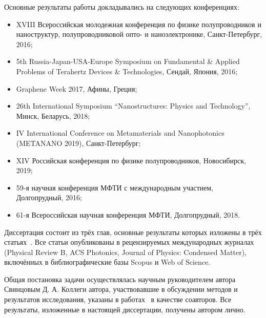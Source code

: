 Основные результаты работы докладывались на следующих конференциях:
\begin{itemize}
\item XVIII Всероссийская молодежная конференция по физике полупроводников и наноструктур, полупроводниковой опто- и наноэлектронике, Санкт-Петербург, 2016;
\item 5th Russia-Japan-USA-Europe Symposium on Fundamental \& Applied Problems of Terahertz Devices \& Technologies, Сендай, Япония, 2016;
\item Graphene Week 2017, Афины, Греция;
\item 26th International Symposium ``Nanostructures: Physics and Technology'', Минск, Беларусь, 2018;
\item IV International Conference on Metamaterials and Nanophotonics (METANANO 2019), Санкт-Петербург;
\item XIV Российская конференция по физике полупроводников, Новосибирск, 2019;
\item 59-я научная конференция МФТИ с международным участием, Долгопрудный, 2016;
\item 61-я Всероссийская научная конференция МФТИ, Долгопрудный, 2018.
\end{itemize}

Диссертация состоит из трёх глав, основные результаты которых изложены в трёх статьях~\cite{my_graphene,my_HgCdTe,my_plasmon}. Все статьи опубликованы в рецензируемых международных журналах (Physical Review B, ACS Photonics, Journal of Physics: Condensed Matter), включённых в библиографические базы Scopus и Web of Science.
    
\contribution Общая постановка задачи осуществлялась научным руководителем
автора Свинцовым Д. А. Коллеги автора, участвовавшие в обсуждении методов и результатов исследования, указаны в работах~\cite{my_graphene,my_HgCdTe,my_plasmon} в качестве соавторов. Все результаты, изложенные в настоящей диссертации, получены автором лично.
